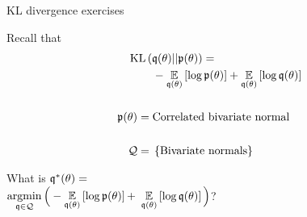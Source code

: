 
\begin{frame}{KL divergence exercises}
\hspace{-3em}
\begin{minipage}{0.5\textwidth}
%
Recall that
\begin{align*}
%
\MoveEqLeft
\kl{\q(\theta)}{\p(\theta)} ={}\\&
-\expect{\q(\theta)}{\log \p(\theta)} +
\expect{\q(\theta)}{\log \q(\theta)}\\ \\
\p(\theta) ={}& \textrm{Correlated bivariate normal}\\ \\
\qdom ={}& \left\{ \textrm{Bivariate normals}\right\}
%
\end{align*}

What is $\mathfrak{q}^*(\theta) = $\\
$\underset{\mathfrak{q} \in \mathcal{Q}}{\mathrm{argmin}}\,
\Big(-\underset{\mathfrak{q}(\theta)}{\mathbb{E}}\left[\log \mathfrak{p}(\theta)\right] +$
\sout{$\underset{\mathfrak{q}(\theta)}{\mathbb{E}}\left[\log \mathfrak{q}(\theta)\right] \Big)$}?
%
\end{minipage}
%
\begin{minipage}{0.4\textwidth}

\end{minipage}

\end{frame}





